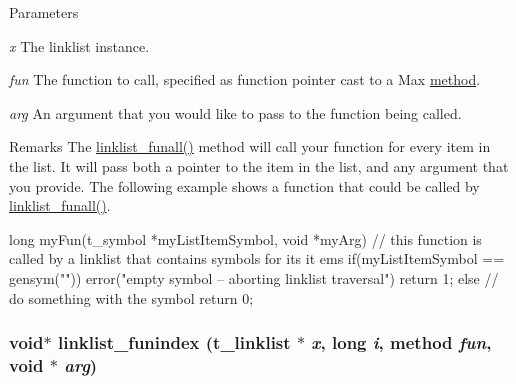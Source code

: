 \begin{DoxyParams}{Parameters}
\item[{\em x}]The linklist instance. \item[{\em fun}]The function to call, specified as function pointer cast to a Max \hyperlink{group__datatypes_gac26ba0a173b50597f5738132e059b42d}{method}. \item[{\em arg}]An argument that you would like to pass to the function being called.\end{DoxyParams}
\begin{DoxyRemark}{Remarks}
The \hyperlink{group__linklist_ga6f4496ef6dc1d6d121acf25d7cd5f946}{linklist\_\-funall()} method will call your function for every item in the list. It will pass both a pointer to the item in the list, and any argument that you provide. The following example shows a function that could be called by \hyperlink{group__linklist_ga6f4496ef6dc1d6d121acf25d7cd5f946}{linklist\_\-funall()}. 
\begin{DoxyCode}
    long myFun(t_symbol *myListItemSymbol, void *myArg)
    {
        // this function is called by a linklist that contains symbols for its it
      ems
        if(myListItemSymbol == gensym("")){
            error("empty symbol -- aborting linklist traversal")
            return 1;           
        }
        else{
            // do something with the symbol
            return 0;
        }
    }
\end{DoxyCode}
 
\end{DoxyRemark}
\hypertarget{group__linklist_ga289838302ecbed343839de955cd8549c}{
\subsubsection[{linklist\_\-funindex}]{\setlength{\rightskip}{0pt plus 5cm}void$\ast$ linklist\_\-funindex ({\bf t\_\-linklist} $\ast$ {\em x}, \/  long {\em i}, \/  {\bf method} {\em fun}, \/  void $\ast$ {\em arg})}}
\label{group__linklist_ga289838302ecbed343839de955cd8549c}



